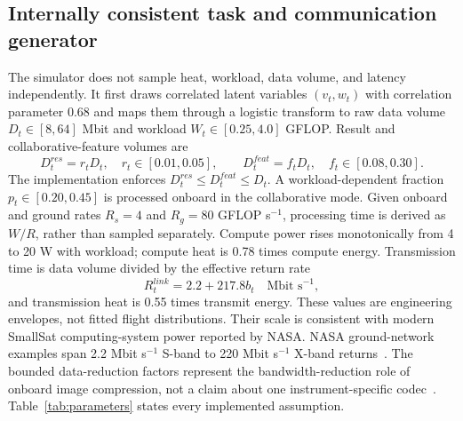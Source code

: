 \documentclass[11pt]{article}
\begin{document}
\begin{table}[H]
\centering
\caption{Implemented 15-dimensional task descriptor dictionary. The complete 24-dimensional observation appends normalized time, sine and cosine of link phase, and six resource coordinates: $h$, $e$, $q$, compute utilization $u$, bandwidth $b$, and contact duration $\tau$.}
\label{tab:state_dictionary}
\resizebox{\textwidth}{!}{}
\end{table}

\subsection{Internally consistent task and communication generator}

The simulator does not sample heat, workload, data volume, and latency independently. It first draws correlated latent variables $(v_t,w_t)$ with correlation parameter 0.68 and maps them through a logistic transform to raw data volume $D_t\in[8,64]$ Mbit and workload $W_t\in[0.25,4.0]$ GFLOP. Result and collaborative-feature volumes are
\begin{equation}
D_t^{res}=r_tD_t,\quad r_t\in[0.01,0.05],\qquad
D_t^{feat}=f_tD_t,\quad f_t\in[0.08,0.30].
\end{equation}
The implementation enforces $D_t^{res}\le D_t^{feat}\le D_t$. A workload-dependent fraction $p_t\in[0.20,0.45]$ is processed onboard in the collaborative mode. Given onboard and ground rates $R_s=4$ and $R_g=80$ GFLOP s$^{-1}$, processing time is derived as $W/R$, rather than sampled separately. Compute power rises monotonically from 4 to 20 W with workload; compute heat is 0.78 times compute energy. Transmission time is data volume divided by the effective return rate
\begin{equation}
R_t^{link}=2.2+217.8b_t\quad\text{Mbit s}^{-1},
\end{equation}
and transmission heat is 0.55 times transmit energy. These values are engineering envelopes, not fitted flight distributions. Their scale is consistent with modern SmallSat computing-system power reported by NASA. NASA ground-network examples span 2.2 Mbit s$^{-1}$ S-band to 220 Mbit s$^{-1}$ X-band returns~\cite{nasa2026avionics,nasa2026ground}. The bounded data-reduction factors represent the bandwidth-reduction role of onboard image compression, not a claim about one instrument-specific codec~\cite{ccsds122}. Table~\ref{tab:parameters} states every implemented assumption.
\end{document}
